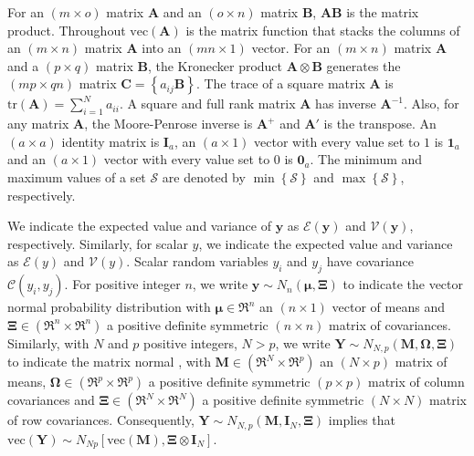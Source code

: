 \documentclass[11pt]{article}
\begin{document}
For an $\left(m\times o\right)$ matrix $\boldsymbol{A}$ and an $\left(o\times n\right)$ matrix $\boldsymbol{B}$, $\boldsymbol{AB}$ is the matrix product. Throughout $\text{vec}(\boldsymbol{A})$ is the matrix function that stacks the columns of an $\left(m\times n\right)$ matrix $\boldsymbol{A}$ into an $\left(mn\times 1\right)$ vector. For an $\left(m\times n\right)$ matrix $\boldsymbol{A}$ and a $\left(p\times q\right)$ matrix $\boldsymbol{B}$, the Kronecker product $\boldsymbol{A}\otimes\boldsymbol{B}$ generates the $\left(mp\times qn\right)$ matrix $\boldsymbol{C}=\left\{a_{ij}\boldsymbol{B}\right\}$. The trace of a square matrix $\boldsymbol{A}$ is $\text{tr}\left(\boldsymbol{A}\right)=\sum_{i=1}^{N}a_{ii}$. A square and full rank matrix $\boldsymbol{A}$ has inverse $\boldsymbol{A}^{-1}$. Also, for any matrix $\boldsymbol{A}$, the Moore-Penrose inverse is $\boldsymbol{A}^{+}$ and $\boldsymbol{A}'$ is the transpose. An $\left(a\times a\right)$ identity matrix is $\boldsymbol{I}_{a}$, an $\left(a\times 1\right)$ vector with every value set to $1$ is $\boldsymbol{1}_{a}$ and an $\left(a\times 1\right)$ vector with every value set to $0$ is $\boldsymbol{0}_{a}$. The minimum and maximum values of a set $\mathcal{S}$ are denoted by $\min\left\{\mathcal{S}\right\}$ and $\max\left\{\mathcal{S}\right\}$, respectively.

We indicate the expected value and variance of $\boldsymbol{y}$ as $\boldsymbol{\mathcal{E}}\left(\boldsymbol{y}\right)$ and $\boldsymbol{\mathcal{V}}\left(\boldsymbol{y}\right)$, respectively. Similarly, for scalar $y$, we indicate the expected value and variance as $\mathcal{E}\left(y\right)$ and $\mathcal{V}\left(y\right)$. Scalar random variables $y_i$ and $y_j$ have covariance $\mathcal{C}\left(y_{i},y_{j}\right)$. For positive integer $n$, we write $\boldsymbol{y}\sim N_{n}\left(\boldsymbol{\mu},\boldsymbol{\Xi}\right)$ to indicate the vector normal probability distribution \cite{arnold_theory_1981} with $\boldsymbol{\mu}\in\Re^{n}$ an $\left(n\times 1\right)$ vector of means and $\boldsymbol{\Xi}\in\left(\Re^{n}\times\Re^{n}\right)$ a positive definite symmetric $\left(n\times n\right)$ matrix of covariances. Similarly, with $N$ and $p$ positive integers, $N>p$, we write $\boldsymbol{Y}\sim N_{N,p}\left(\boldsymbol{M},\boldsymbol{\Omega},\boldsymbol{\Xi}\right)$ to indicate the matrix normal \cite{arnold_theory_1981}, with $\boldsymbol{M}\in\left(\Re^{N}\times\Re^{p}\right)$ an $\left(N\times p\right)$ matrix of means, $\boldsymbol{\Omega}\in\left(\Re^{p}\times\Re^{p}\right)$ a positive definite symmetric $\left(p\times p\right)$ matrix of column covariances and $\boldsymbol{\Xi}\in\left(\Re^{N}\times\Re^{N}\right)$ a positive definite symmetric $\left(N\times N\right)$ matrix of row covariances. Consequently, $\boldsymbol{Y}\sim N_{N,p}\left(\boldsymbol{M},\boldsymbol{I}_{N},\boldsymbol{\Xi}\right)$ implies that $\text{vec}\left(\boldsymbol{Y}\right)\sim N_{Np}\left[\text{vec}\left(\boldsymbol{M}\right),\boldsymbol{\Xi} \otimes \boldsymbol{I}_{N}\right]$.
\end{document}
